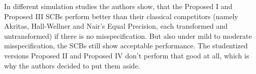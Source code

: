 In different simulation studies the authors show, that the Proposed I and Proposed III SCBs perform better than their classical competitors (namely Akritas, Hall-Wellner and Nair's Equal Precision, each transformed and untransformed) if there is no misspecification. But also under mild to moderate misspecification, the SCBs still show acceptable performance.
The studentized versions Proposed II and Proposed IV don't perform that good at all, which is why the authors decided to put them aside.
